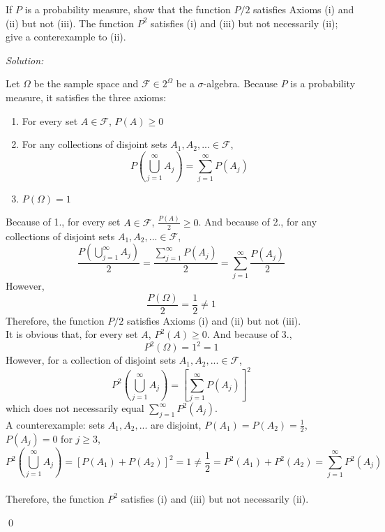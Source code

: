 \documentclass[12pt]{article}
\newenvironment{problem}[2][Problem]{\begin{trivlist}
\item[\hskip \labelsep {\bfseries #1}\hskip \labelsep {\bfseries #2.}]}{\end{trivlist}}
\newenvironment{sol}
    {\emph{Solution:}
    }
    {
    \qed
    }
\begin{document}
\begin{problem}{2}
If $P$ is a probability measure, show that the function $P/2$ satisfies Axioms (i) and (ii) but not (iii). The function $P^2$ satisfies (i) and (iii) but not necessarily (ii); give a conterexample to (ii).
\end{problem}
\begin{sol}
Let $\Omega$ be the sample space and $\mathscr{F}\in2^{\Omega}$ be a $\sigma$-algebra. Because $P$ is a probability measure, it satisfies the three axioms:
\begin{enumerate}
\item For every set $A\in\mathscr{F}$, $P(A)\geq0$
\item For any collections of disjoint sets $A_1, A_2, ...\in\mathscr{F}$, $$P(\bigcup_{j=1}^{\infty}A_j)=\sum_{j=1}^{\infty}P(A_j)$$
\item $P(\Omega)=1$
\end{enumerate}

Because of 1., for every set $A\in\mathscr{F}$, $\frac{P(A)}{2}\geq0$. And because of 2., for any collections of disjoint sets $A_1, A_2, ...\in\mathscr{F}$, 
\[
\frac{P(\bigcup_{j=1}^{\infty}A_j)}{2}=\frac{\sum_{j=1}^{\infty}P(A_j)}{2}=\sum_{j=1}^{\infty}\frac{P(A_j)}{2}
\]
However,
\[
\frac{P(\Omega)}{2}=\frac{1}{2}\neq1
\]
Therefore, the function $P/2$ satisfies Axioms (i) and (ii) but not (iii).\\
It is obvious that, for every set $A$, $P^2(A)\geq0$. And because of 3.,
\[
P^2(\Omega)=1^2=1
\]
However, for a collection of disjoint sets $A_1, A_2, ...\in\mathscr{F}$,
\[
P^2(\bigcup_{j=1}^{\infty}A_j)=[\sum_{j=1}^{\infty}P(A_j)]^2
\]
which does not necessarily equal $\sum_{j=1}^{\infty}P^2(A_j)$.\\
A counterexample: sets $A_1, A_2, ...$ are disjoint, $P(A_1)=P(A_2)=\frac{1}{2}$, $P(A_j)=0$ for $j\geq3$, $$P^2(\bigcup_{j=1}^{\infty}A_j)=[P(A_1)+P(A_2)]^2=1\neq\frac{1}{2}=P^2(A_1)+P^2(A_2)=\sum_{j=1}^{\infty}P^2(A_j)$$\\
Therefore, the function $P^2$ satisfies (i) and (iii) but not necessarily (ii).
\end{sol}
\end{document}
